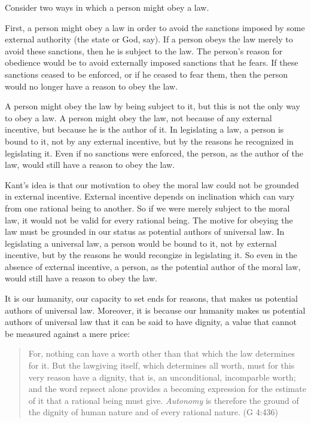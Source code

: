 Consider two ways in which a person might obey a law.

First, a person might obey a law in order to avoid the sanctions imposed by some external authority (the state or God, say). If a person obeys the law merely to avoid these sanctions, then he is subject to the law. The person's reason for obedience would be to avoid externally imposed sanctions that he fears. If these sanctions ceased to be enforced, or if he ceased to fear them, then the person would no longer have a reason to obey the law.

A person might obey the law by being subject to it, but this is not the only way to obey a law. A person might obey the law, not because of any external incentive, but because he is the author of it. In legislating a law, a person is bound to it, not by any external incentive, but by the reasons he recognized in legislating it. Even if no sanctions were enforced, the person, as the author of the law, would still have a reason to obey the law.

Kant's idea is that our motivation to obey the moral law could not be grounded in external incentive. External incentive depends on inclination which can vary from one rational being to another. So if we were merely subject to the moral law, it would not be valid for every rational being. The motive for obeying the law must be grounded in our status as potential authors of universal law. In legislating a universal law, a person would be bound to it, not by external incentive, but by the reasons he would recongize in legislating it. So even in the absence of external incentive, a person, as the potential author of the moral law, would still have a reason to obey the law.

It is our humanity, our capacity to set ends for reasons, that makes us potential authors of universal law. Moreover, it is because our humanity makes us potential authors of universal law that it can be said to have dignity, a value that cannot be measured against a mere price:

\begin{quote}
For, nothing can have a worth other than that which the law determines for it. But the lawgiving itself, which determines all worth, must for this very reason have a dignity, that is, an unconditional, incomparble worth; and the word repsect alone provides a becoming expression for the estimate of it that a rational being must give. \emph{Autonomy} is therefore the ground of the dignity of human nature and of every rational nature. (G 4:436)
\end{quote}

